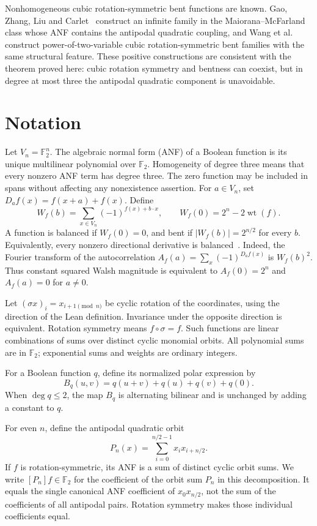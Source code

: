 \documentclass[11pt,a4paper]{article}
\theoremstyle{remark}
\theoremstyle{plain}
\newcommand{\F}{\mathbb F_2}
\newcommand{\wt}{\operatorname{wt}}
\begin{document}
Nonhomogeneous cubic rotation-symmetric bent functions are known. Gao, Zhang, Liu and Carlet~\cite{gao2012} construct an infinite family in the Maiorana--McFarland class whose ANF contains the antipodal quadratic coupling, and Wang et al.~\cite{wang2015} construct power-of-two-variable cubic rotation-symmetric bent families with the same structural feature. These positive constructions are consistent with the theorem proved here: cubic rotation symmetry and bentness can coexist, but in degree at most three the antipodal quadratic component is unavoidable.

\section{Notation}
Let $V_n=\F^n$. The algebraic normal form (ANF) of a Boolean function is its unique multilinear polynomial over $\F$. Homogeneity of degree three means that every nonzero ANF term has degree three. The zero function may be included in spans without affecting any nonexistence assertion.
For $a\in V_n$, set $D_a f(x)=f(x+a)+f(x)$. Define
\[
 W_f(b)=\sum_{x\in V_n}(-1)^{f(x)+b\cdot x},\qquad
 W_f(0)=2^n-2\wt(f).
\]
A function is balanced if $W_f(0)=0$, and bent if $|W_f(b)|=2^{n/2}$ for every $b$. Equivalently, every nonzero directional derivative is balanced~\cite{rothaus}. Indeed, the Fourier transform of the autocorrelation $A_f(a)=\sum_x(-1)^{D_af(x)}$ is $W_f(b)^2$. Thus constant squared Walsh magnitude is equivalent to $A_f(0)=2^n$ and $A_f(a)=0$ for $a\ne0$.

Let $(\sigma x)_i=x_{i+1\pmod n}$ be cyclic rotation of the coordinates, using the direction of the Lean definition. Invariance under the opposite direction is equivalent. Rotation symmetry means $f\circ\sigma=f$. Such functions are linear combinations of sums over distinct cyclic monomial orbits. All polynomial sums are in $\F$; exponential sums and weights are ordinary integers.

For a Boolean function $q$, define its normalized polar expression by
\[
B_q(u,v)=q(u+v)+q(u)+q(v)+q(0).
\]
When $\deg q\le2$, the map $B_q$ is alternating bilinear and is unchanged by adding a constant to $q$.

For even $n$, define the antipodal quadratic orbit
\[
P_n(x)=\sum_{i=0}^{n/2-1}x_i x_{i+n/2}.
\]
If $f$ is rotation-symmetric, its ANF is a sum of distinct cyclic orbit sums. We write $[P_n]f\in\F$ for the coefficient of the orbit sum $P_n$ in this decomposition. It equals the single canonical ANF coefficient of $x_0x_{n/2}$, not the sum of the coefficients of all antipodal pairs. Rotation symmetry makes those individual coefficients equal.
\end{document}
